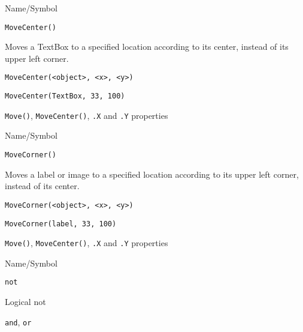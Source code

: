 \rl

\begin{desc}{Name/Symbol}
\item[Name/Symbol]	\verb+MoveCenter()+

\item[Description]	Moves a TextBox to a specified location
		according to its center, instead of its upper left corner.

\item[Usage]
\begin{verbatim}
MoveCenter(<object>, <x>, <y>)
\end{verbatim}

\item[Example]	
\begin{verbatim}
MoveCenter(TextBox, 33, 100)
\end{verbatim}

\item[See Also]	\verb+Move()+, \verb+MoveCenter()+, \verb+.X+ and \verb+.Y+ properties
\end{desc}

\rl


\begin{desc}{Name/Symbol}
\item[Name/Symbol]	\verb+MoveCorner()+

\item[Description]	Moves a label or image to a specified location
		according to its upper left corner, instead of its center. 

\item[Usage]
\begin{verbatim}
MoveCorner(<object>, <x>, <y>)
\end{verbatim}

\item[Example]	
\begin{verbatim}
MoveCorner(label, 33, 100)
\end{verbatim}

\item[See Also]	\verb+Move()+, \verb+MoveCenter()+, \verb+.X+ and \verb+.Y+ properties
\end{desc}

\rl






\begin{desc}{Name/Symbol}
\item[Name/Symbol]	\verb+not+

\item[Description]	Logical not

\item[Usage]		

\item[Example]	

\item[See Also]	\verb+and+, \verb+or+
\end{desc}

